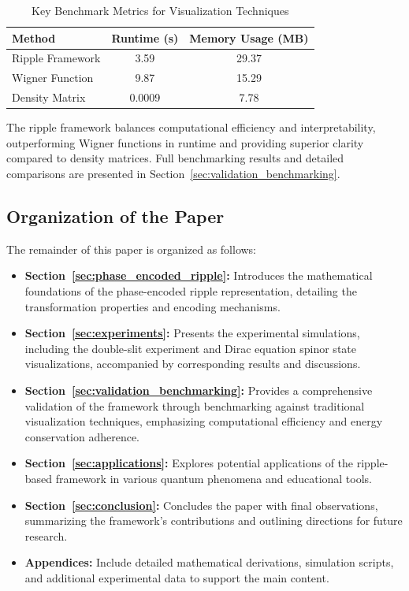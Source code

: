 \documentclass[12pt]{article}
\begin{document}
\begin{table}[H]
\centering
\caption{Key Benchmark Metrics for Visualization Techniques}
\begin{tabular}{|l|c|c|}
    \hline
    \textbf{Method} & \textbf{Runtime (s)} & \textbf{Memory Usage (MB)} \\
    \hline
    Ripple Framework    & 3.59        & 29.37             \\
    Wigner Function     & 9.87        & 15.29             \\
    Density Matrix      & 0.0009      & 7.78              \\
    \hline
\end{tabular}
\label{tab:preview_results}
\end{table}

The ripple framework balances computational efficiency and interpretability, outperforming Wigner functions in runtime and providing superior clarity compared to density matrices. Full benchmarking results and detailed comparisons are presented in Section~\ref{sec:validation_benchmarking}.

\subsection{Organization of the Paper}

The remainder of this paper is organized as follows:
\begin{itemize}
    \item \textbf{Section~\ref{sec:phase_encoded_ripple}:} Introduces the mathematical foundations of the phase-encoded ripple representation, detailing the transformation properties and encoding mechanisms.
    \item \textbf{Section~\ref{sec:experiments}:} Presents the experimental simulations, including the double-slit experiment and Dirac equation spinor state visualizations, accompanied by corresponding results and discussions.
    \item \textbf{Section~\ref{sec:validation_benchmarking}:} Provides a comprehensive validation of the framework through benchmarking against traditional visualization techniques, emphasizing computational efficiency and energy conservation adherence.
    \item \textbf{Section~\ref{sec:applications}:} Explores potential applications of the ripple-based framework in various quantum phenomena and educational tools.
    \item \textbf{Section~\ref{sec:conclusion}:} Concludes the paper with final observations, summarizing the framework's contributions and outlining directions for future research.
    \item \textbf{Appendices:} Include detailed mathematical derivations, simulation scripts, and additional experimental data to support the main content.
\end{itemize}
\end{document}
